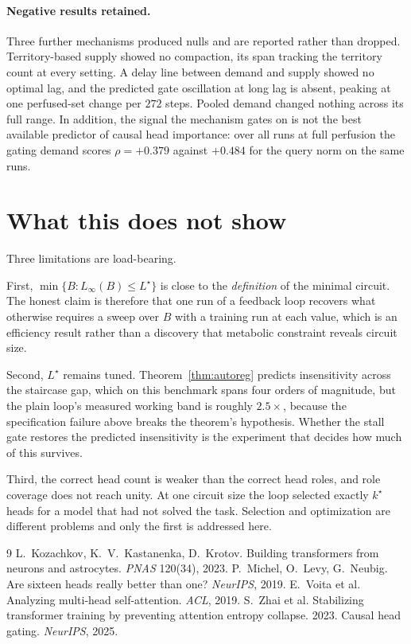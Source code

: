 \documentclass[10pt,twocolumn]{article}
\theoremstyle{plain}
\theoremstyle{definition}
\theoremstyle{remark}
\begin{document}
\paragraph{Negative results retained.} Three further mechanisms produced nulls and are
reported rather than dropped. Territory-based supply showed no compaction, its span
tracking the territory count at every setting. A delay line between demand and supply
showed no optimal lag, and the predicted gate oscillation at long lag is absent, peaking
at one perfused-set change per $272$ steps. Pooled demand changed nothing across its full
range. In addition, the signal the mechanism gates on is not the best available predictor
of causal head importance: over all runs at full perfusion the gating demand scores
$\rho = +0.379$ against $+0.484$ for the query norm on the same runs.

\section{What this does not show}
\label{sec:limits}

Three limitations are load-bearing.

First, $\min\{B : L_\infty(B) \le L^\star\}$ is close to the \emph{definition} of the
minimal circuit. The honest claim is therefore that one run of a feedback loop recovers
what otherwise requires a sweep over $B$ with a training run at each value, which is an
efficiency result rather than a discovery that metabolic constraint reveals circuit size.

Second, $L^\star$ remains tuned. Theorem~\ref{thm:autoreg} predicts insensitivity across
the staircase gap, which on this benchmark spans four orders of magnitude, but the plain
loop's measured working band is roughly $2.5\times$, because the specification failure
above breaks the theorem's hypothesis. Whether the stall gate restores the predicted
insensitivity is the experiment that decides how much of this survives.

Third, the correct head count is weaker than the correct head roles, and role coverage
does not reach unity. At one circuit size the loop selected exactly $k^\star$ heads for a
model that had not solved the task. Selection and optimization are different problems and
only the first is addressed here.

\begin{thebibliography}{9}\small
{} L.~Kozachkov, K.~V.~Kastanenka, D.~Krotov.
  Building transformers from neurons and astrocytes. \emph{PNAS} 120(34), 2023.
 P.~Michel, O.~Levy, G.~Neubig.
  Are sixteen heads really better than one? \emph{NeurIPS}, 2019.
 E.~Voita et al.
  Analyzing multi-head self-attention. \emph{ACL}, 2019.
 S.~Zhai et al.
  Stabilizing transformer training by preventing attention entropy collapse. 2023.
 Causal head gating. \emph{NeurIPS}, 2025.
\end{thebibliography}
\end{document}
